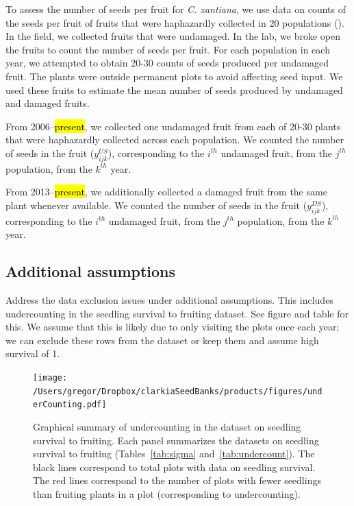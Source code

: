 \documentclass[12pt, oneside, titlepage]{article}   	%
\begin{document}
To assess the number of seeds per fruit for \textit{C. xantiana}, we use data on counts of the seeds per fruit of fruits that were haphazardly collected in 20 populations (\cite{eckhart2011}). In the field, we collected fruits that were undamaged. In the lab, we broke open the fruits to count the number of seeds per fruit. For each population in each year, we attempted to obtain 20-30 counts of seeds produced per undamaged fruit. The plants were outside permanent plots to avoid affecting seed input. We used these fruits to estimate the mean number of seeds produced by undamaged and damaged fruits.

From 2006--\hl{present}, we collected one undamaged fruit from each of 20-30 plants that were haphazardly collected across each population. We counted the number of seeds in the fruit ($y^{US}_{ijk}$), corresponding to the $i^{th}$ undamaged fruit, from the $j^{th}$ population, from the $k^{th}$ year.

From 2013--\hl{present}, we additionally collected a damaged fruit from the same plant whenever available. We counted the number of seeds in the fruit ($y^{DS}_{ijk}$), corresponding to the $i^{th}$ undamaged fruit, from the $j^{th}$ population, from the $k^{th}$ year. 

\subsection{Additional assumptions}
 
 Address the data exclusion issues under additional assumptions. This includes undercounting in the seedling survival to fruiting dataset. See figure and table for this. We assume that this is likely due to only visiting the plots once each year; we can exclude these rows from the dataset or keep them and assume high survival of 1. 
 
  \begin{figure}[h]
   \centering
       \texttt{[image: /Users/gregor/Dropbox/clarkiaSeedBanks/products/figures/underCounting.pdf]}  
    \caption{ Graphical summary of undercounting in the dataset on seedling survival to fruiting. Each panel summarizes the datasets on seedling survival to fruiting (Tables~\ref{tab:sigma} and~\ref{tab:undercount}). The black lines correspond to total plots with data on seedling survival. The red lines correspond to the number of plots with fewer seedlings than fruiting plants in a plot (corresponding to undercounting). }
 \label{fig:obs_pred}
\end{figure}
\end{document}
